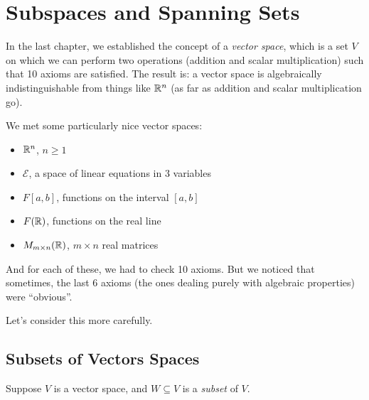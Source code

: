 \chapter{Subspaces and Spanning Sets}\label{Chapter:05subspaces}

In the last chapter, we established the concept of a \emph{vector space},
which is a set $V$ on which we can perform two operations
(addition and scalar multiplication) such that 10 axioms
are satisfied.  The result is:  a vector space is algebraically
indistinguishable from things like $\mathbb{R}^n$ (as far
as addition and scalar multiplication go).

We met some particularly nice vector spaces:
\begin{itemize}
\item $\mathbb{R}^n$, $n\geq 1$
\item $\mathcal{E}$, a space of linear equations in 3 variables
\item $F[a,b]$, functions on the interval $[a,b]$
\item $F(\mathbb{R})$, functions on the real line
\item $M_{m\times n}(\mathbb{R})$, $m\times n$ real matrices
\end{itemize}
And for each of these, we had to check 10 axioms.  But we
noticed that sometimes, the last 6 axioms (the ones dealing
purely with algebraic properties) were ``obvious''.

Let's consider this more carefully.




\section{Subsets of Vectors Spaces}  
Suppose $V$ is a vector space, and $W \subseteq V$ is a \emph{subset} of 
$V$.  

